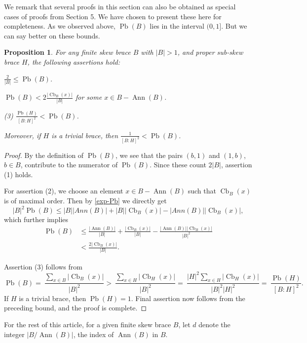 \documentclass[oneside]{amsart}
\numberwithin{equation}{section}
\theoremstyle{plain}
\newtheorem{pro}[equation]{Proposition}
\theoremstyle{definition}
\newcommand{\Cb}{\operatorname{Cb} }
\newcommand{\Pb}{\operatorname{Pb} }
\newcommand{\Ann}{\operatorname{Ann} }
\begin{document}
   
 We remark that several proofs in this section can also be obtained as  special cases of proofs from Section 5. We have chosen to present these here for completeness.   As we observed above, $\Pb(B)$ lies in the interval $(0, 1]$. But we can say better on these bounds.
\begin{pro}
   For any finite skew brace $B$ with $|B| > 1$, and proper sub-skew brace $H$, the following assertions hold:
   
 $\frac{2}{|B|} \leqslant \Pb(B)$.   \label{pro: card B and comm B}

 $\Pb(B)   < 2\frac{|\Cb_{B}(x)|}{|B|}$ for some $x \in B - \Ann(B)$.

\text(3) $\frac{\Pb(H)}{{[B:H]}^2} < \Pb(B)$. \label{pro:sub skew and commutative}

\noindent Moreover, if $H$ is a trivial brace, then 
  $\frac{1}{{[B:H]}^2}  < \Pb(B)$.
\end{pro}
\begin{proof}
By the definition of $\Pb(B)$, we see that the pairs $(b, 1)$ and $(1, b)$, $b \in B$, contribute to the numerator of $\Pb(B)$. Since these count $2 |B|$, assertion (1) holds.

For assertion (2), we choose an element $x \in B - \Ann(B)$ such that $\Cb_B(x)$ is of maximal order. Then by \eqref{exp-Pb} we directly get
$$|B|^2\Pb(B) \leqslant  |B||Ann(B)| + |B||\Cb_B(x)| - |Ann(B)||\Cb_B(x)|,$$
which further implies
\begin{align*}
        \Pb(B) &\leqslant \frac{|\Ann(B)|}{|B|} + \frac{|\Cb_B(x)|}{|B|}-\frac{|\Ann(B)||\Cb_B(x)|}{|B|^2}\\
        &< \frac{2|\Cb_B(x)|}{|B|}.
      \end{align*}

Assertion (3) follows from
      $$\Pb(B)=~\frac{\sum_{x\in B}|\Cb_{B}(x)|}{|B|^2} > ~ \frac{\sum_{x\in H}|\Cb_{H}(x)|}{|B|^2}=~ \frac{|H|^2\sum_{x\in H}|\Cb_{H}(x)|}{|B|^2|H|^2}=~ \frac{\Pb(H)}{{[B:H]}^2}.$$   
If $H$ is a trivial brace, then $\Pb(H) = 1$. Final assertion now follows from the preceding bound, and the proof is complete.
\end{proof}



For the rest of this article, for a given finite skew brace $B$, let $d$ denote the integer  $|B/\Ann(B)|$, the index of $\Ann(B)$ in $B$.
\end{document}
